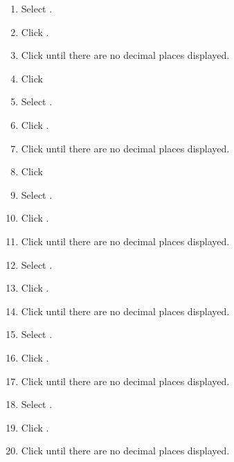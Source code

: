 \begin{enumbox}
\begin{enumerate}
		\item Select .
		\item Click .
		\item Click  until there are no decimal places displayed.
		\item Click  
	
		\item Select .
		\item Click .
		\item Click  until there are no decimal places displayed.
		\item Click  
	
		\item Select .
		\item Click .
		\item Click  until there are no decimal places displayed.
	
		\item Select .
		\item Click .
		\item Click  until there are no decimal places displayed.
	
		\item Select .
		\item Click .
		\item Click  until there are no decimal places displayed.
	
		\item Select .
		\item Click .
		\item Click  until there are no decimal places displayed.
	

\end{enumerate}
\end{enumbox}

